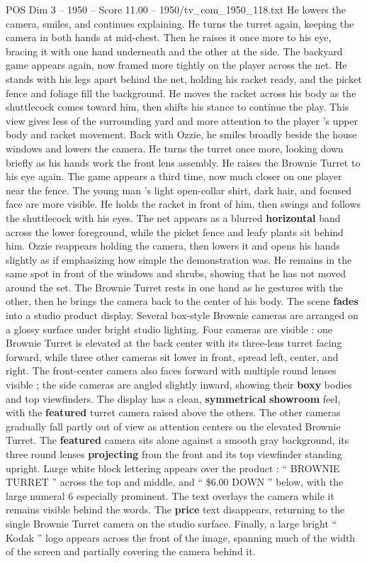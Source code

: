 \begin{textsample}{POS Dim 3 – 1950 – Score 11.00 – 1950/tv\_com\_1950\_118.txt}
He lowers the camera, smiles, and continues explaining.
He turns the turret again, keeping the camera in both hands at mid-chest.
Then he raises it once more to his eye, bracing it with one hand underneath and the other at the side.
The backyard game appears again, now framed more tightly on the player across the net.
He stands with his legs apart behind the net, holding his racket ready, and the picket fence and foliage fill the background.
He moves the racket across his body as the shuttlecock comes toward him, then shifts his stance to continue the play.
This view gives less of the surrounding yard and more attention to the player ’s upper body and racket movement.
Back with Ozzie, he smiles broadly beside the house windows and lowers the camera.
He turns the turret once more, looking down briefly as his hands work the front lens assembly.
He raises the Brownie Turret to his eye again.
The game appears a third time, now much closer on one player near the fence.
The young man ’s light open-collar shirt, dark hair, and focused face are more visible.
He holds the racket in front of him, then swings and follows the shuttlecock with his eyes.
The net appears as a blurred \textbf{horizontal} band across the lower foreground, while the picket fence and leafy plants sit behind him.
Ozzie reappears holding the camera, then lowers it and opens his hands slightly as if emphasizing how simple the demonstration was.
He remains in the same spot in front of the windows and shrubs, showing that he has not moved around the set.
The Brownie Turret rests in one hand as he gestures with the other, then he brings the camera back to the center of his body.
The scene \textbf{fades} into a studio product display.
Several box-style Brownie cameras are arranged on a glossy surface under bright studio lighting.
Four cameras are visible : one Brownie Turret is elevated at the back center with its three-lens turret facing forward, while three other cameras sit lower in front, spread left, center, and right.
The front-center camera also faces forward with multiple round lenses visible ; the side cameras are angled slightly inward, showing their \textbf{boxy} bodies and top viewfinders.
The display has a clean, \textbf{symmetrical} \textbf{showroom} feel, with the \textbf{featured} turret camera raised above the others.
The other cameras gradually fall partly out of view as attention centers on the elevated Brownie Turret.
The \textbf{featured} camera sits alone against a smooth gray background, its three round lenses \textbf{projecting} from the front and its top viewfinder standing upright.
Large white block lettering appears over the product : “ BROWNIE TURRET ” across the top and middle, and “ \$6.00 DOWN ” below, with the large numeral 6 especially prominent.
The text overlays the camera while it remains visible behind the words.
The \textbf{price} text disappears, returning to the single Brownie Turret camera on the studio surface.
Finally, a large bright “ Kodak ” logo appears across the front of the image, spanning much of the width of the screen and partially covering the camera behind it.

\end{textsample}
